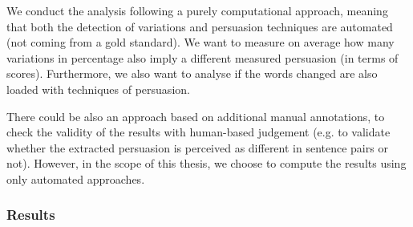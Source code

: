 We conduct the analysis following a purely computational approach, meaning that both the detection of variations and persuasion techniques are automated (not coming from a gold standard).
%
We want to measure on average how many variations in percentage also imply a different measured persuasion (in terms of scores). %
Furthermore, we also want to analyse if the words changed are also loaded with techniques of persuasion.

There could be also an approach based on additional manual annotations, to check the validity of the results with human-based judgement (e.g. to validate whether the extracted persuasion is perceived as different in sentence pairs or not).
However, in the scope of this thesis, we choose to compute the results using only automated approaches.



\subsubsection{Results}
\label{ssec:lp_relationship_small_variations_quant}


